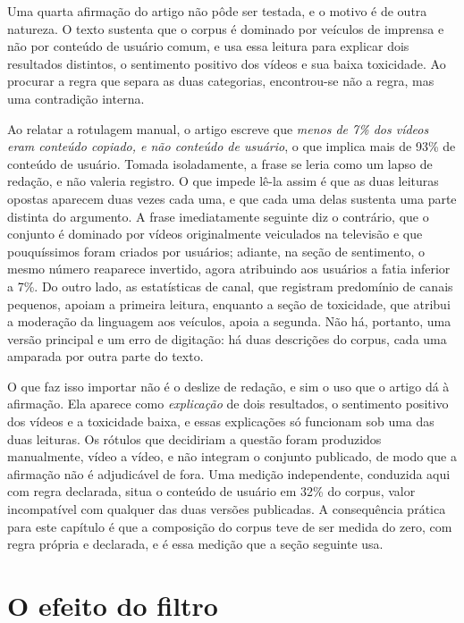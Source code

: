 Uma quarta afirmação do artigo não pôde ser testada, e o motivo é de outra natureza.
O texto sustenta que o corpus é dominado por veículos de imprensa e não por conteúdo
de usuário comum, e usa essa leitura para explicar dois resultados distintos, o
sentimento positivo dos vídeos e sua baixa toxicidade. Ao procurar a regra que
separa as duas categorias, encontrou-se não a regra, mas uma contradição interna.

Ao relatar a rotulagem manual, o artigo escreve que \emph{menos de 7\% dos vídeos
eram conteúdo copiado, e não conteúdo de usuário}, o que implica mais de 93\% de
conteúdo de usuário. Tomada isoladamente, a frase se leria como um lapso de redação,
e não valeria registro. O que impede lê-la assim é que as duas leituras opostas
aparecem duas vezes cada uma, e que cada uma delas sustenta uma parte distinta do
argumento. A frase imediatamente seguinte diz o contrário, que o conjunto é dominado
por vídeos originalmente veiculados na televisão e que pouquíssimos foram criados por
usuários; adiante, na seção de sentimento, o mesmo número reaparece invertido, agora
atribuindo aos usuários a fatia inferior a 7\%. Do outro lado, as estatísticas de
canal, que registram predomínio de canais pequenos, apoiam a primeira leitura,
enquanto a seção de toxicidade, que atribui a moderação da linguagem aos veículos,
apoia a segunda. Não há, portanto, uma versão principal e um erro de digitação: há
duas descrições do corpus, cada uma amparada por outra parte do texto.

O que faz isso importar não é o deslize de redação, e sim o uso que o artigo dá à
afirmação. Ela aparece como \emph{explicação} de dois resultados, o sentimento
positivo dos vídeos e a toxicidade baixa, e essas explicações só funcionam sob uma
das duas leituras. Os rótulos que decidiriam a questão foram produzidos manualmente,
vídeo a vídeo, e não integram o conjunto publicado, de modo que a afirmação não é
adjudicável de fora. Uma medição independente, conduzida aqui com regra declarada,
situa o conteúdo de usuário em 32\% do corpus, valor incompatível com qualquer das
duas versões publicadas. A consequência prática para este capítulo é que a
composição do corpus teve de ser medida do zero, com regra própria e declarada, e é
essa medição que a seção seguinte usa.

\section{O efeito do filtro}

